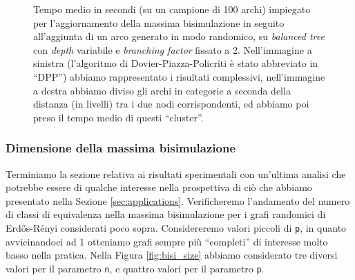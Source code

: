 \begin{figure}[t!]
\begin{subfigure}[t]{0.48\textwidth}
    \end{subfigure}
    \caption{Tempo medio in secondi (su un campione di 100 archi) impiegato per l'aggiornamento della massima bisimulazione in seguito all'aggiunta di un arco generato in modo randomico, su \emph{balanced tree} con \emph{depth} variabile e \emph{branching factor} fissato a 2. Nell'immagine a sinistra (l'algoritmo di Dovier-Piazza-Policriti è stato abbreviato in ``DPP'') abbiamo rappresentato i risultati complessivi, nell'immagine a destra abbiamo diviso gli archi in categorie a seconda della distanza (in livelli) tra i due nodi corrispondenti, ed abbiamo poi preso il tempo medio di questi ``cluster''.}
    \label{fig:saha_results_tree}
\end{figure}

\subsubsection{Dimensione della massima bisimulazione}
Terminiamo la sezione relativa ai risultati sperimentali con un'ultima analisi che potrebbe essere di qualche interesse nella prospettiva di ciò che abbiamo presentato nella Sezione \ref{sec:applications}. Verificheremo l'andamento del numero di classi di equivalenza nella massima bisimulazione per i grafi randomici di Erdős-Rényi considerati poco sopra. Considereremo valori piccoli di \verb|p|, in quanto avvicinandoci ad 1 otteniamo grafi sempre più ``completi'' di interesse molto basso nella pratica. Nella Figura \ref{fig:bisi_size} abbiamo considerato tre diversi valori per il parametro \verb|n|, e quattro valori per il parametro \verb|p|.

